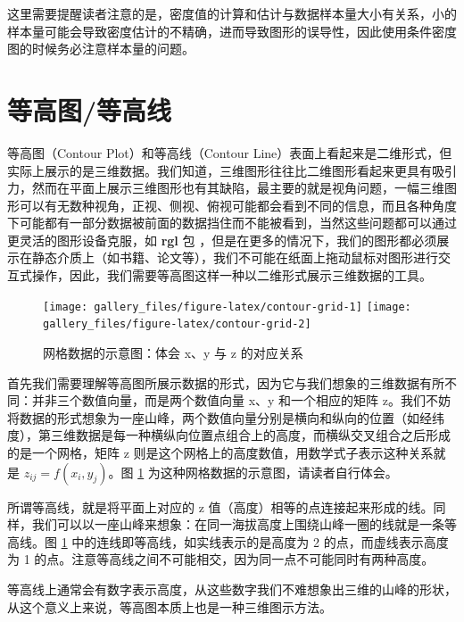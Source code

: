 \documentclass[
  b5paper,
  UTF8,twoside]{book}
\begin{document}
这里需要提醒读者注意的是，密度值的计算和估计与数据样本量大小有关系，小的样本量可能会导致密度估计的不精确，进而导致图形的误导性，因此使用条件密度图的时候务必注意样本量的问题。

\hypertarget{sec:contour}{%
\section{等高图/等高线}\label{sec:contour}}

等高图（Contour Plot）和等高线（Contour
Line）表面上看起来是二维形式，但实际上展示的是三维数据。我们知道，三维图形往往比二维图形看起来更具有吸引力，然而在平面上展示三维图形也有其缺陷，最主要的就是视角问题，一幅三维图形可以有无数种视角，正视、侧视、俯视可能都会看到不同的信息，而且各种角度下可能都有一部分数据被前面的数据挡住而不能被看到，当然这些问题都可以通过更灵活的图形设备克服，如 \textbf{rgl} 包 \citep{rgl}，但是在更多的情况下，我们的图形都必须展示在静态介质上（如书籍、论文等），我们不可能在纸面上拖动鼠标对图形进行交互式操作，因此，我们需要等高图这样一种以二维形式展示三维数据的工具。





\begin{figure}

{\centering \texttt{[image: gallery\_files/figure-latex/contour-grid-1]} \texttt{[image: gallery\_files/figure-latex/contour-grid-2]} 

}

\caption[网格数据的示意图]{网格数据的示意图：体会 x、y 与 z 的对应关系}\label{fig:contour-grid}
\end{figure}

首先我们需要理解等高图所展示数据的形式，因为它与我们想象的三维数据有所不同：并非三个数值向量，而是两个数值向量 x、y 和一个相应的矩阵 z。我们不妨将数据的形式想象为一座山峰，两个数值向量分别是横向和纵向的位置（如经纬度），第三维数据是每一种横纵向位置点组合上的高度，而横纵交叉组合之后形成的是一个网格，矩阵 z 则是这个网格上的高度数值，用数学式子表示这种关系就是 \(z_{ij}=f(x_{i},y_{j})\)。图 \ref{fig:contour-grid} 为这种网格数据的示意图，请读者自行体会。

所谓等高线，就是将平面上对应的 z 值（高度）相等的点连接起来形成的线。同样，我们可以以一座山峰来想象：在同一海拔高度上围绕山峰一圈的线就是一条等高线。图 \ref{fig:contour-grid}
中的连线即等高线，如实线表示的是高度为 2 的点，而虚线表示高度为 1 的点。注意等高线之间不可能相交，因为同一点不可能同时有两种高度。

等高线上通常会有数字表示高度，从这些数字我们不难想象出三维的山峰的形状，从这个意义上来说，等高图本质上也是一种三维图示方法。
\end{document}
